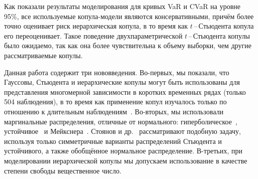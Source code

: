Как показали результаты моделирования для кривых VaR и CVaR на уровне 95\%, все используемые копула-модели являются консервативными, причём более точно оценивает риск иерархическая копула, в то время как $t$\,--\,Стьюдента копула его переоценивает.
Такое поведение двухпараметрической $t$\,--\,Стьюдента копулы было ожидаемо, так как она более чувствительна к объему выборки, чем другие рассматриваемые копулы.

Данная работа содержит три нововведения.
Во-первых, мы показали, что Гауссовы, Стьюдента и иерархические копулы могут быть использованы для представления многомерной зависимости в коротких временных рядах (только 504 наблюдения), в то время как применение копул изучалось только по отношению к длительным наблюдениям~\cite{Dissmann2013, Kole2007, Lourme2016}.
Во-вторых, мы использовали маргинальные распределения, отличные от нормального: гиперболическое~\cite{Barndoff1983}, устойчивое~\cite{Rachev2005} и Мейкснера~\cite{Schoutens2002}. Стоянов и др.~\cite{Stoyanov2013} рассматривают подобную задачу, используя только симметричные варианты распределений Стьюдента и устойчивого, а также обобщённое нормальное распределение.
В-третьих, при моделировании иерархической копулы мы допускаем использование в качестве степени свободы вещественное число. 


